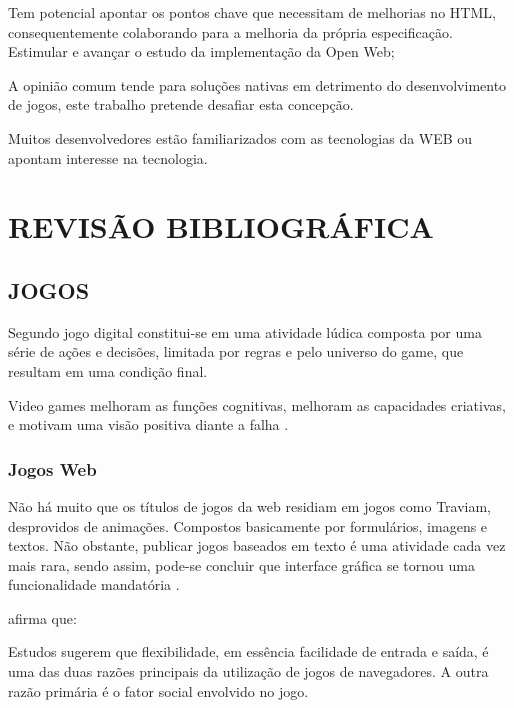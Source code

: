 \documentclass[
12pt,
a4paper,
portuges,
draft
]{report}
\renewenvironment{quote}
               {\list{}{\rightmargin\leftmargin}%
                \item\relax\fontsize{10}{12}}
               {\endlist}
\begin{document}
Tem potencial apontar os pontos chave que necessitam
de melhorias no HTML, consequentemente colaborando para a
melhoria da própria especificação.
Estimular e avançar o estudo da implementação da Open Web;

A opinião comum tende para soluções nativas em detrimento do
desenvolvimento de jogos, este trabalho pretende desafiar esta
concepção. %

Muitos desenvolvedores estão familiarizados
com as tecnologias da WEB ou apontam interesse na tecnologia.



\chapter{REVISÃO BIBLIOGRÁFICA}

\section{JOGOS}
Segundo \autocite{indieGamesLemes} jogo digital constitui-se em uma
atividade lúdica composta por uma série de ações e decisões,
limitada por regras e pelo universo do game, que resultam em uma
condição final.

Video games melhoram as funções cognitivas, melhoram as capacidades criativas, e
motivam uma visão positiva diante a falha \autocite{gamebenefits}.

\subsection{Jogos Web}

Não há muito que os títulos de jogos da web residiam em jogos como Traviam, desprovidos de animações. Compostos basicamente por formulários, imagens e textos. Não obstante, publicar jogos baseados em texto é uma atividade cada vez mais rara, sendo assim, pode-se concluir que interface gráfica se tornou uma funcionalidade mandatória \autocite{browserGamesTechnologyAndFuture}.


\cite{browserGamesTechnologyAndFuture} afirma que:
\begin{quote}
Estudos sugerem que flexibilidade, em essência facilidade de entrada e saída, é uma das duas razões principais da utilização de jogos de navegadores. A outra razão primária é o fator social envolvido no jogo.
\end{quote}

\end{document}
